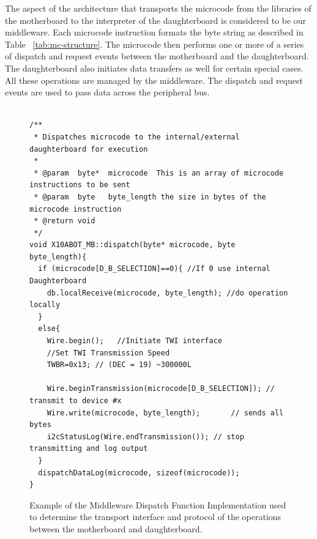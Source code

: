 	The aspect of the \xten architecture that transports the microcode from the libraries of the motherboard to the interpreter of the daughterboard is considered to be our middleware. Each microcode instruction formats the byte string as described in Table ~\ref{tab:mc-structure}. The microcode then performs one or more of a series of dispatch and request events between the motherboard and the daughterboard. The daughterboard also initiates data transfers as well for certain special cases. All these operations are managed by the middleware. The dispatch and request events are used to pass data across the peripheral bus.
	\begin{figure}
    \footnotesize
    {\fontsize{8}{6}\selectfont
    \begin{verbatim}

/**
 * Dispatches microcode to the internal/external daughterboard for execution
 *
 * @param  byte*  microcode  This is an array of microcode instructions to be sent
 * @param  byte   byte_length the size in bytes of the microcode instruction
 * @return void
 */
void X10ABOT_MB::dispatch(byte* microcode, byte byte_length){
  if (microcode[D_B_SELECTION]==0){ //If 0 use internal Daughterboard
    db.localReceive(microcode, byte_length); //do operation locally
  }
  else{
    Wire.begin();   //Initiate TWI interface
    //Set TWI Transmission Speed
    TWBR=0x13; // (DEC = 19) ~300000L
   
    Wire.beginTransmission(microcode[D_B_SELECTION]); // transmit to device #x
    Wire.write(microcode, byte_length);       // sends all bytes
    i2cStatusLog(Wire.endTransmission()); // stop transmitting and log output
  }
  dispatchDataLog(microcode, sizeof(microcode));
}
	\end{verbatim}
    }
    \caption{Example of the Middleware Dispatch Function Implementation used to determine the transport interface and protocol of the operations between the motherboard and daughterboard.} \label{code:dispatch}
    \end{figure}

